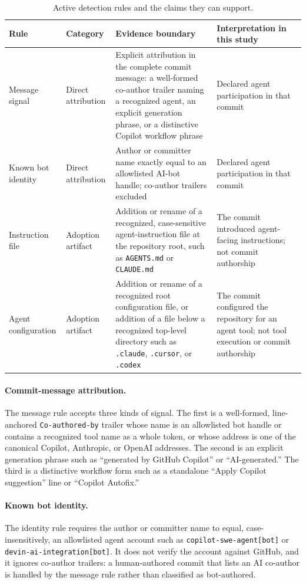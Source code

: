\documentclass[smallextended,natbib]{svjour3}
\newcommand{\tool}[1]{\texttt{#1}}
\begin{document}
\begin{table}[ht]
\caption{Active detection rules and the claims they can support.}
\label{tab:rules}
\centering
\footnotesize
\begin{tabularx}{\textwidth}{@{}p{2.1cm}p{2.2cm}Y Y@{}}
\toprule
\textbf{Rule} & \textbf{Category} & \textbf{Evidence boundary} & \textbf{Interpretation in this study} \\
\midrule
Message signal & Direct attribution & Explicit attribution in the complete
commit message: a well-formed co-author trailer naming a recognized agent,
an explicit generation phrase, or a distinctive Copilot workflow phrase &
Declared agent participation in that commit \\
Known bot identity & Direct attribution & Author or committer name exactly
equal to an allowlisted AI-bot handle; co-author trailers excluded &
Declared agent participation in that commit \\
Instruction file & Adoption artifact & Addition or rename of a recognized,
case-sensitive agent-instruction file at the repository root, such as
\tool{AGENTS.md} or \tool{CLAUDE.md} & The commit introduced agent-facing
instructions; not commit authorship \\
Agent configuration & Adoption artifact & Addition or rename of a recognized
root configuration file, or addition of a file below a recognized top-level
directory such as \tool{.claude}, \tool{.cursor}, or \tool{.codex} &
The commit configured the repository for an agent tool; not tool execution or
commit authorship \\
\bottomrule
\end{tabularx}
\end{table}

\paragraph{Commit-message attribution.}
The message rule accepts three kinds of signal.  The first is a well-formed,
line-anchored \tool{Co-authored-by} trailer whose name is an allowlisted bot
handle or contains a recognized tool name as a whole token, or whose address is
one of the canonical Copilot, Anthropic, or OpenAI addresses.  The second is an
explicit generation phrase such as ``generated by GitHub Copilot'' or
``AI-generated.''  The third is a distinctive workflow form such as a
standalone ``Apply Copilot suggestion'' line or ``Copilot Autofix.''

\paragraph{Known bot identity.}
The identity rule requires the author or committer name to equal,
case-insensitively, an allowlisted agent account such as
\tool{copilot-swe-agent[bot]} or \tool{devin-ai-integration[bot]}.  It does not
verify the account against GitHub, and it ignores co-author trailers: a
human-authored commit that lists an AI co-author is handled by the message rule
rather than classified as bot-authored.
\end{document}
